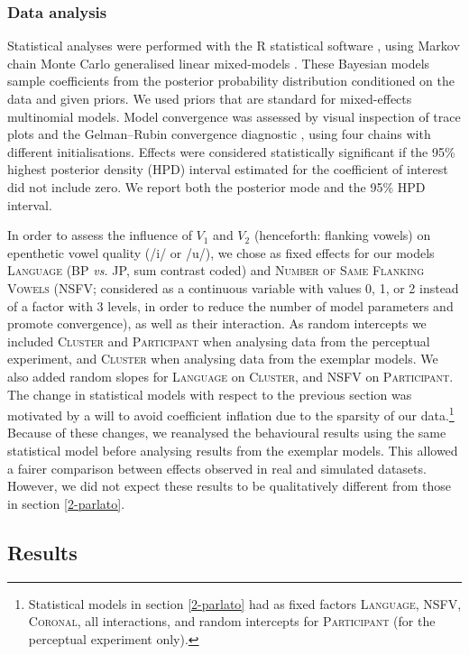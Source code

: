\subsubsection{Data analysis}
Statistical analyses were performed with the R statistical software \cite{R-base}, using Markov chain Monte Carlo generalised linear mixed-models \cite{R-MCMCglmm, R-coda}. These Bayesian models sample coefficients from the posterior probability distribution conditioned on the data and given priors. We used priors that are standard for mixed-effects multinomial models. Model convergence was assessed by visual inspection of trace plots and the Gelman–Rubin convergence diagnostic \cite{gelman1992}, using four chains with different initialisations. Effects were considered statistically significant if the 95\% highest posterior density (HPD) interval estimated for the coefficient of interest did not include zero. We report both the posterior mode and the 95\% HPD interval.  

In order to assess the influence of $V_{1}$ and $V_{2}$ (henceforth: flanking vowels) on epenthetic vowel quality (/i/ or /u/), we chose as fixed effects for our models \textsc{Language} (BP \textit{vs.} JP, sum contrast coded) and \textsc{Number of Same Flanking Vowels} (\textsc{NSFV}; considered as a continuous variable with values 0, 1, or 2 instead of a factor with 3 levels, in order to reduce the number of model parameters and promote convergence), as well as their interaction. As random intercepts we included \textsc{Cluster} and \textsc{Participant} when analysing data from the perceptual experiment, and \textsc{Cluster} when analysing data from the exemplar models. We also added random slopes for \textsc{Language} on \textsc{Cluster}, and \textsc{NSFV} on \textsc{Participant}. The change in statistical models with respect to the previous section was motivated by a will to avoid coefficient inflation due to the sparsity of our data.\footnote{Statistical models in section \ref{2-parlato} had as fixed factors \textsc{Language}, \textsc{NSFV}, \textsc{Coronal}, all interactions, and random intercepts for \textsc{Participant} (for the perceptual experiment only).}
Because of these changes, we reanalysed the behavioural results using the same statistical model before analysing results from the exemplar models. This allowed a fairer comparison between effects observed in real and simulated datasets. However, we did not expect these results to be qualitatively different from those in section \ref{2-parlato}.   

\subsection{Results} 

